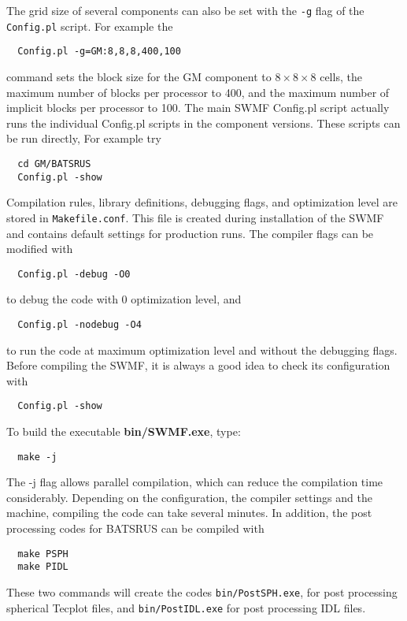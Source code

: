 The grid size of several components can also be set with the {\tt -g}
flag of the {\tt Config.pl} script. For example the 
\begin{verbatim}
  Config.pl -g=GM:8,8,8,400,100
\end{verbatim}
command sets the block size for the GM component to $8\times 8\times 8$ cells, 
the maximum number of blocks per processor to 400, 
and the maximum number of implicit blocks per processor to 100.
The main SWMF Config.pl script actually runs the individual Config.pl
scripts in the component versions. These scripts can be run directly,
For example try
\begin{verbatim}
  cd GM/BATSRUS
  Config.pl -show
\end{verbatim}
Compilation rules, library definitions, debugging flags, and optimization 
level are stored in {\tt Makefile.conf}. This file is created during
installation of the SWMF and contains default settings for production runs.
The compiler flags can be modified with
\begin{verbatim}
  Config.pl -debug -O0
\end{verbatim}
to debug the code with 0 optimization level, and
\begin{verbatim}
  Config.pl -nodebug -O4
\end{verbatim}
to run the code at maximum optimization level and without the debugging flags.
Before compiling the SWMF, it is always a good idea to check its configuration
with
\begin{verbatim}
  Config.pl -show
\end{verbatim}
To build the executable {\bf bin/SWMF.exe}, type:
\begin{verbatim}
  make -j
\end{verbatim} 
The -j flag allows parallel compilation, which can reduce the compilation
time considerably.
Depending on the configuration, the compiler settings and the machine, 
compiling the code can take several minutes. 
In addition, the post processing codes for BATSRUS can be compiled with
\begin{verbatim}
  make PSPH
  make PIDL
\end{verbatim} 
These two commands will create the codes {\tt bin/PostSPH.exe}, for post
processing spherical Tecplot files, and {\tt bin/PostIDL.exe} 
for post processing IDL files.

